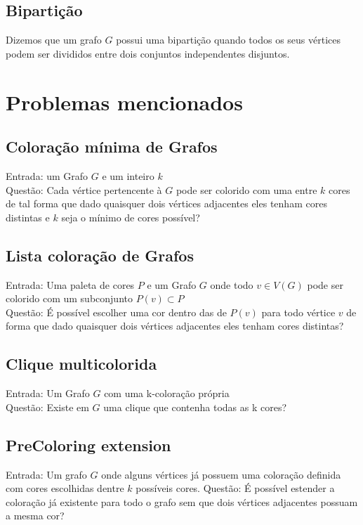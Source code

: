 \subsection{Bipartição}
\begin{definition}
 Dizemos que um grafo $G$ possui uma bipartição quando todos os seus vértices podem ser divididos entre dois conjuntos independentes disjuntos.
\end{definition}

\section{Problemas mencionados}

\subsection{Coloração mínima de Grafos}
\begin{definition}
	Entrada: um Grafo $G$ e um inteiro $k$\\
	Questão: Cada vértice pertencente à $G$ pode ser colorido com uma entre $k$ cores
	de tal forma que dado quaisquer dois vértices adjacentes eles tenham cores distintas e $k$ seja o mínimo de cores possível?
\end{definition}

\subsection{Lista coloração de Grafos}
\begin{definition}
  Entrada: Uma paleta de cores $P$ e um Grafo $G$ onde todo $v \in V(G)$ pode ser colorido com um subconjunto $P(v) \subset P$\\
  Questão: É possível escolher uma cor dentro das de $P(v)$ para todo vértice $v$ de forma que dado quaisquer dois vértices adjacentes eles tenham cores distintas?
\end{definition}

\subsection{Clique multicolorida}
\begin{definition}
 Entrada: Um Grafo $G$ com uma k-coloração própria\\
 Questão: Existe em $G$ uma clique que contenha todas as k cores?
\end{definition}

\subsection{PreColoring extension}
\begin{definition}
 Entrada: Um grafo $G$ onde alguns vértices já possuem uma coloração definida com cores escolhidas dentre $k$ possíveis cores.
 Questão: É possível estender a coloração já existente para todo o grafo sem que dois vértices adjacentes possuam a mesma cor? 
\end{definition}

